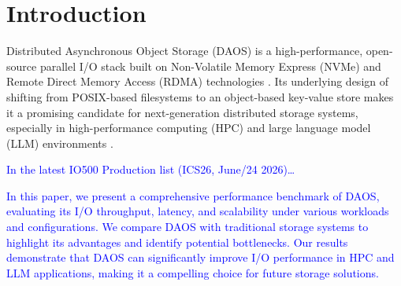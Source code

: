 \section{Introduction}

Distributed Asynchronous Object Storage (DAOS) is a high-performance, open-source parallel I/O stack built on Non-Volatile Memory Express (NVMe) and Remote Direct Memory Access (RDMA) technologies \cite{daos-exascale-storage2016sc, daos-intro2020, daos-dram-intro2023, daos-repo}. Its underlying design of shifting from POSIX-based filesystems to an object-based key-value store makes it a promising candidate for next-generation distributed storage systems, especially in high-performance computing (HPC) and large language model (LLM) environments \cite{hdf5-daos2022tpds, daos-adios2024ISC, daos2024weather_flow, mei2024sc-poster, daos-smartnic2025}.

\textcolor{blue}{
In the latest IO500 \cite{io500-ics26} Production list (ICS26, June/24 2026)\dots \cite{io500-ics26}
}


\textcolor{blue}{
In this paper, we present a comprehensive performance benchmark of DAOS, evaluating its I/O throughput, latency, and scalability under various workloads and configurations. We compare DAOS with traditional storage systems to highlight its advantages and identify potential bottlenecks. Our results demonstrate that DAOS can significantly improve I/O performance in HPC and LLM applications, making it a compelling choice for future storage solutions.
}
